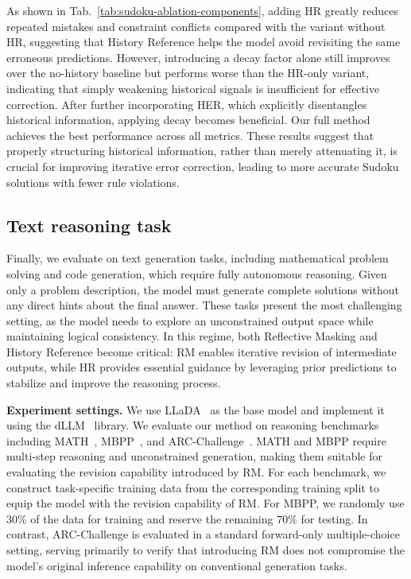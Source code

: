 \documentclass{llmxive}
\providecommand{\methodfull}{Reflective Masking\xspace}
\providecommand{\method}{RM\xspace}
\providecommand{\temporalmethodfull}{History Reference\xspace}
\providecommand{\temporalmethod}{HR\xspace}
\providecommand{\distancemethod}{HER\xspace}
\begin{document}
As shown in Tab.~\ref{tab:sudoku-ablation-components}, adding \temporalmethod greatly reduces repeated mistakes and constraint conflicts compared with the variant without \temporalmethod, suggesting that \temporalmethodfull helps the model avoid revisiting the same erroneous predictions. 
However, introducing a decay factor alone still improves over the no-history baseline but performs worse than the \temporalmethod-only variant, indicating that simply weakening historical signals is insufficient for effective correction. After further incorporating \distancemethod, which explicitly disentangles historical information, applying decay becomes beneficial. Our full method achieves the best performance across all metrics. These results suggest that properly structuring historical information, rather than merely attenuating it, is crucial for improving iterative error correction, leading to more accurate Sudoku solutions with fewer rule violations.


\subsection{Text reasoning task}
\label{sec:textgen-experiments}

Finally, we evaluate on text generation tasks, including mathematical problem solving and code generation, which require fully autonomous reasoning.
Given only a problem description, the model must generate complete solutions without any direct hints about the final answer. These tasks present the most challenging setting, as the model needs to explore an unconstrained output space while maintaining logical consistency.
In this regime, both \methodfull and \temporalmethodfull become critical: \method enables iterative revision of intermediate outputs, while \temporalmethod provides essential guidance by leveraging prior predictions to stabilize and improve the reasoning process.

\textbf{Experiment settings.}
We use LLaDA~\citep{nie2025large} as the base model and implement it using the dLLM~\citep{zhou2026dllm} library. We evaluate our method on reasoning benchmarks including MATH~\citep{lightman2023let,hendrycks2021measuring,lewkowycz2022solving}, MBPP~\citep{austin2021program}, and ARC-Challenge~\citep{clark2018think}. MATH and MBPP require multi-step reasoning and unconstrained generation, making them suitable for evaluating the revision capability introduced by \method. For each benchmark, we construct task-specific training data from the corresponding training split to equip the model with the revision capability of \method. For MBPP, we randomly use 30\% of the data for training and reserve the remaining 70\% for testing. In contrast, ARC-Challenge is evaluated in a standard forward-only multiple-choice setting, serving primarily to verify that introducing \method does not compromise the model’s original inference capability on conventional generation tasks.
\end{document}

